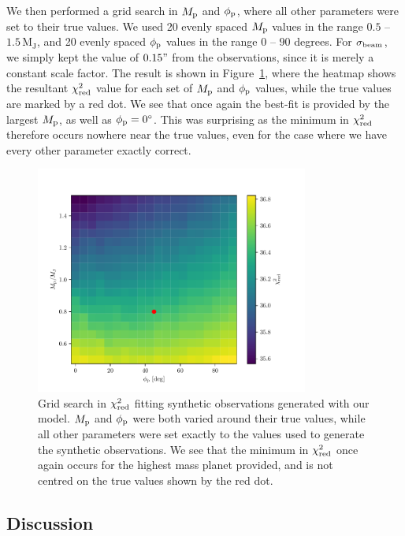 We then performed a grid search in $M_{\rm p}$ and $\phi_{\rm p}$, where all other parameters were set to their true values.
We used 20 evenly spaced $M_{\rm p}$ values in the range $0.5$ -- $1.5 \, \mathrm{M_J}$, and 20 evenly spaced $\phi_{\rm p}$ values in the range $0$ -- $90$ degrees.
For $\sigma_{\rm beam}$, we simply kept the value of $0.15"$ from the observations, since it is merely a constant scale factor.
The result is shown in Figure~\ref{fig:planet_grid_search}, where the heatmap shows the resultant $\chi^2_{\rm red}$ value for each set of $M_{\rm p}$ and $\phi_{\rm p}$ values, while the true values are marked by a red dot.
We see that once again the best-fit is provided by the largest $M_{\rm p}$, as well as $\phi_{\rm p}= 0^\circ$.
This was surprising as the minimum in $\chi^2_{\rm red}$ therefore occurs nowhere near the true values, even for the case where we have every other parameter exactly correct. 
\begin{figure}
    \centering
    \includegraphics[width = 0.8\textwidth]{figures/planet_mass_az_grid_var.pdf}
    \caption{Grid search in $\chi^2_{\rm red}$ fitting synthetic observations generated with our model. $M_{\rm p}$ and $\phi_{\rm p}$ were both varied around their true values, while all other parameters were set exactly to the values used to generate the synthetic observations. We see that the minimum in $\chi^2_{\rm red}$ once again occurs for the highest mass planet provided, and is not centred on the true values shown by the red dot.}
    \label{fig:planet_grid_search}
\end{figure}

\subsection{Discussion}

